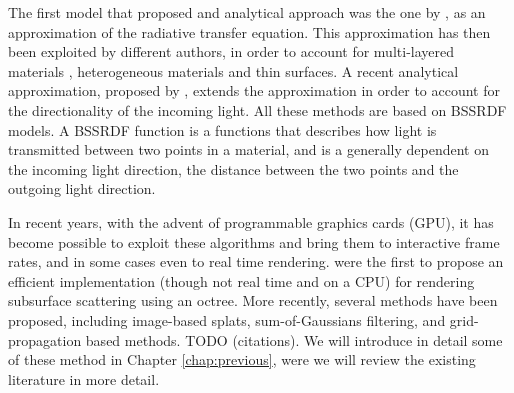 The first model that proposed and analytical approach was the one by \cite{Jensen:2001:PMS:383259.383319}, as an approximation of the radiative transfer equation. This approximation has then been exploited by different authors, in order to account for multi-layered materials \citep{Donner:2005:LDM:1186822.1073308}, heterogeneous materials \citep{journals/cgf/WangWHSYG10} and thin surfaces\citep{journals/cgf/WangWHSYG10}. A recent analytical approximation, proposed by \cite{IMM2013-06646}, extends the approximation in order to account for the directionality of the incoming light. All these methods are based on BSSRDF models. A BSSRDF function is a functions that describes how light is transmitted between two points in a material, and is a generally dependent on the incoming light direction, the distance between the two points and the outgoing light direction.

In recent years, with the advent of programmable graphics cards (GPU), it has become possible to exploit these algorithms and bring them to interactive frame rates, and in some cases even to real time rendering. \cite{Jensen:2002:RHR:566654.566619} were the first to propose an efficient implementation (though not real time and on a CPU) for rendering subsurface scattering using an octree. More recently, several methods have been proposed, including image-based splats, sum-of-Gaussians filtering, and grid-propagation based methods. TODO (citations). We will introduce in detail some of these method in Chapter \ref{chap:previous}, were we will review the existing literature in more detail.


